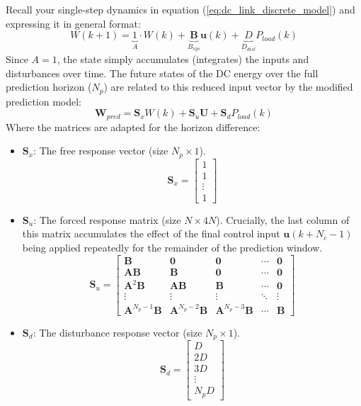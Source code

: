 Recall your single-step dynamics in equation (\ref{eq:dc_link_discrete_model}) and expressing it in general format:
\begin{equation}
    W(k+1) = \underbrace{1}_{A} \cdot W(k) + \underbrace{\mathbf{B}}_{B_{sys}} \mathbf{u}(k) + \underbrace{D}_{D_{dist}} P_{load}(k)
\end{equation}
Since $A=1$, the state simply accumulates (integrates) the inputs and disturbances over time.
The future states of the DC energy over the full prediction horizon ($N_p$) are related to this reduced input vector by the modified prediction model:
\begin{equation}
    \mathbf{W}_{pred} = \mathbf{S}_x W(k) + \mathbf{S}_u \mathbf{U} + \mathbf{S}_d P_{load}(k)
    \label{eq:prediction_model_matrix}
\end{equation}
Where the matrices are adapted for the horizon difference:
\begin{itemize}
    \item $\mathbf{S}_x$: The free response vector (size $N_p \times 1$).
          $$\mathbf{S}_x = \begin{bmatrix} 1 \\ 1 \\ \vdots \\ 1 \end{bmatrix}$$
    \item $\mathbf{S}_u$: The forced response matrix (size $N \times 4N$). Crucially, the last column of this matrix accumulates
          the effect of the final control input $\mathbf{u}(k+N_c-1)$ being applied repeatedly for the remainder of the prediction window.
          \begin{equation}
              \mathbf{S}_u = \begin{bmatrix}
                  \mathbf{B}                   & \mathbf{0}                   & \mathbf{0}                   & \cdots & \mathbf{0} \\
                  \mathbf{A}\mathbf{B}         & \mathbf{B}                   & \mathbf{0}                   & \cdots & \mathbf{0} \\
                  \mathbf{A}^2\mathbf{B}       & \mathbf{A}\mathbf{B}         & \mathbf{B}                   & \cdots & \mathbf{0} \\
                  \vdots                       & \vdots                       & \vdots                       & \ddots & \vdots     \\
                  \mathbf{A}^{N_p-1}\mathbf{B} & \mathbf{A}^{N_p-2}\mathbf{B} & \mathbf{A}^{N_p-3}\mathbf{B} & \cdots & \mathbf{B}
              \end{bmatrix}
          \end{equation}
    \item $\mathbf{S}_d$: The disturbance response vector (size $N_p \times 1$).
          $$\mathbf{S}_d = \begin{bmatrix} D \\ 2D \\ 3D \\ \vdots \\ N_p D \end{bmatrix}$$
\end{itemize}
